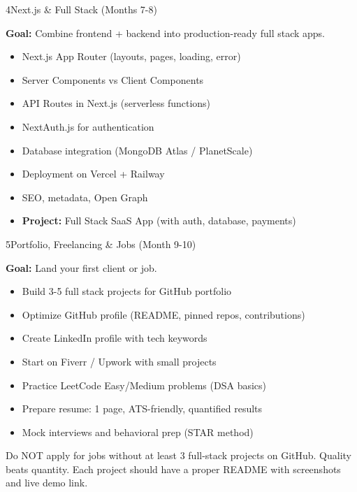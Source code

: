 \documentclass[12pt,a4paper]{article}
\begin{document}
\begin{roadmapstep}{4}{Next.js \& Full Stack (Months 7-8)}

\textbf{Goal:} Combine frontend + backend into production-ready full stack apps.

\vspace{0.3cm}
\begin{itemize}[leftmargin=1.5em, itemsep=4pt]
    \item[\ding{62}] Next.js App Router (layouts, pages, loading, error)
    \item[\ding{62}] Server Components vs Client Components
    \item[\ding{62}] API Routes in Next.js (serverless functions)
    \item[\ding{62}] NextAuth.js for authentication
    \item[\ding{62}] Database integration (MongoDB Atlas / PlanetScale)
    \item[\ding{62}] Deployment on Vercel + Railway
    \item[\ding{62}] SEO, metadata, Open Graph
    \item[\ding{62}] \textbf{Project:} Full Stack SaaS App (with auth, database, payments)
\end{itemize}

\end{roadmapstep}

\vspace{0.5cm}

\begin{roadmapstep}{5}{Portfolio, Freelancing \& Jobs (Month 9-10)}

\textbf{Goal:} Land your first client or job.

\vspace{0.3cm}
\begin{itemize}[leftmargin=1.5em, itemsep=4pt]
    \item[\ding{62}] Build 3-5 full stack projects for GitHub portfolio
    \item[\ding{62}] Optimize GitHub profile (README, pinned repos, contributions)
    \item[\ding{62}] Create LinkedIn profile with tech keywords
    \item[\ding{62}] Start on Fiverr / Upwork with small projects
    \item[\ding{62}] Practice LeetCode Easy/Medium problems (DSA basics)
    \item[\ding{62}] Prepare resume: 1 page, ATS-friendly, quantified results
    \item[\ding{62}] Mock interviews and behavioral prep (STAR method)
\end{itemize}

\begin{warningbox}
Do NOT apply for jobs without at least 3 full-stack projects on GitHub. Quality beats quantity. Each project should have a proper README with screenshots and live demo link.
\end{warningbox}

\end{roadmapstep}
\end{document}
